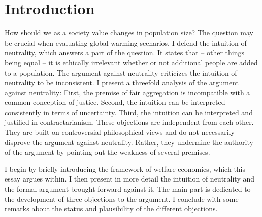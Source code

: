 \chapter*{Introduction}

How should we as a society value changes in population size? The question may be crucial when evaluating global warming scenarios. I defend the intuition of neutrality, which answers a part of the question. It states that – other things being equal – it is ethically irrelevant whether or not additional people are added to a population. The argument against neutrality criticizes the intuition of neutrality to be inconsistent. I present a threefold analysis of the argument against neutrality: First, the premise of fair aggregation is incompatible with a common conception of justice. Second, the intuition can be interpreted consistently in terms of uncertainty. Third, the intuition can be interpreted and justified in contractarianism. These objections are independent from each other. They are built on controversial philosophical views and do not necessarily disprove the argument against neutrality. Rather, they undermine the authority of the argument by pointing out the weakness of several premises.  

I begin by briefly introducing the framework of welfare economics, which this essay argues within. I then present in more detail the intuition of neutrality and the formal argument brought forward against it. The main part is dedicated to the development of three objections to the argument. I conclude with some remarks about the status and plausibility of the different objections. 